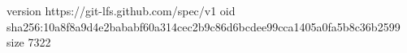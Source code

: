 version https://git-lfs.github.com/spec/v1
oid sha256:10a8f8a9d4e2bababf60a314cec2b9c86d6bcdee99cca1405a0fa5b8c36b2599
size 7322
